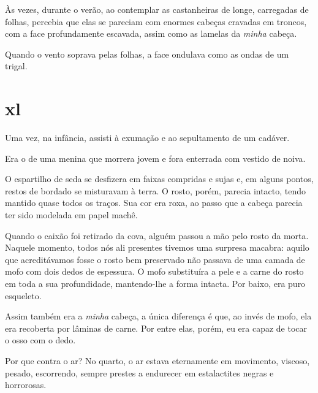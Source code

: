 Às vezes, durante o verão, ao contemplar as castanheiras de longe, carregadas
de folhas, percebia que elas se pareciam com enormes cabeças cravadas em
troncos, com a face profundamente escavada, assim como as lamelas da \textit
{minha} cabeça.

Quando o vento soprava pelas folhas, a face ondulava como as ondas de um
trigal.



\section{xl} 


Uma vez, na infância, assisti à exumação e ao sepultamento de um cadáver.

Era o de uma menina que morrera jovem e fora enterrada com vestido de noiva. 

O espartilho de seda se desfizera em faixas compridas e sujas e, em alguns
pontos, restos de bordado se misturavam à terra. O rosto, porém, parecia
intacto, tendo mantido quase todos os traços. Sua cor era roxa, ao passo que
a cabeça parecia ter sido modelada em papel machê.

Quando o caixão foi retirado da cova, alguém passou a mão pelo rosto da morta.
Naquele momento, todos nós ali presentes tivemos uma surpresa macabra: aquilo
que acreditávamos fosse o rosto bem preservado não passava de uma camada de
mofo com dois dedos de espessura. O mofo substituíra a pele e a carne do
rosto em toda a sua profundidade, mantendo-lhe a forma intacta. Por baixo,
era puro esqueleto.

Assim também era a \textit{minha} cabeça, a única diferença é que, ao invés de
mofo, ela era recoberta por lâminas de carne. Por entre elas, porém, eu era
capaz de tocar o osso com o dedo.


Por que contra o ar? No quarto, o ar estava eternamente em movimento, viscoso,
pesado, escorrendo, sempre prestes a endurecer em estalactites negras e
horrorosas.

